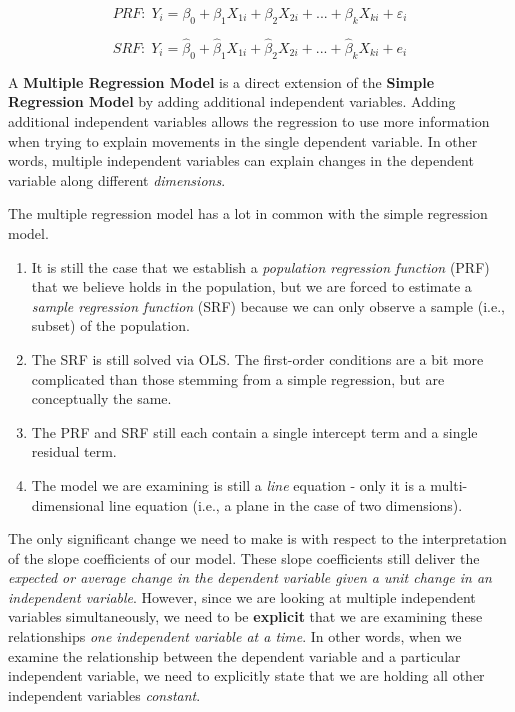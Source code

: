 \documentclass[
]{book}
\begin{document}
\[PRF:\;Y_i=\beta_0+\beta_1X_{1i}+\beta_2X_{2i}+...+\beta_kX_{ki}+\varepsilon_i\]

\[SRF:\;Y_i=\hat{\beta}_0+\hat{\beta}_1X_{1i}+\hat{\beta}_2X_{2i}+...+\hat{\beta}_kX_{ki}+e_i\]

A \textbf{Multiple Regression Model} is a direct extension of the \textbf{Simple Regression Model} by adding additional independent variables. Adding additional independent variables allows the regression to use more information when trying to explain movements in the single dependent variable. In other words, multiple independent variables can explain changes in the dependent variable along different \emph{dimensions}.

The multiple regression model has a lot in common with the simple regression model.

\begin{enumerate}
\def\labelenumi{\arabic{enumi}.}
\item
  It is still the case that we establish a \emph{population regression function} (PRF) that we believe holds in the population, but we are forced to estimate a \emph{sample regression function} (SRF) because we can only observe a sample (i.e., subset) of the population.
\item
  The SRF is still solved via OLS. The first-order conditions are a bit more complicated than those stemming from a simple regression, but are conceptually the same.
\item
  The PRF and SRF still each contain a single intercept term and a single residual term.
\item
  The model we are examining is still a \emph{line} equation - only it is a multi-dimensional line equation (i.e., a plane in the case of two dimensions).
\end{enumerate}

The only significant change we need to make is with respect to the interpretation of the slope coefficients of our model. These slope coefficients still deliver the \emph{expected or average change in the dependent variable given a unit change in an independent variable}. However, since we are looking at multiple independent variables simultaneously, we need to be \textbf{explicit} that we are examining these relationships \emph{one independent variable at a time}. In other words, when we examine the relationship between the dependent variable and a particular independent variable, we need to explicitly state that we are holding all other independent variables \emph{constant}.
\end{document}
